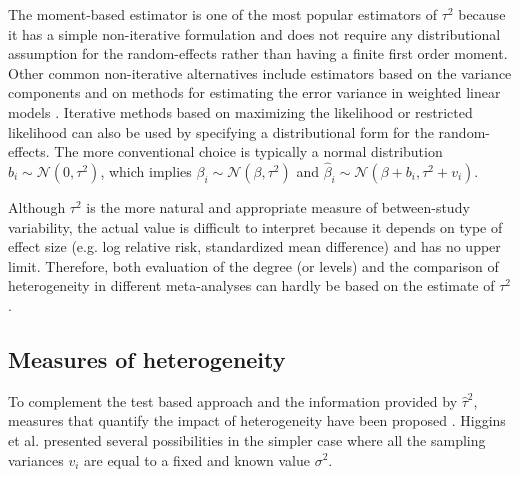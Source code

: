 \documentclass[11pt,a4paper,twoside,openany]{book}\usepackage{knitr}
\begin{document}
{\noindent The moment-based estimator is one of the most popular estimators of $\tau^2$ because it has a simple non-iterative formulation and does not require any distributional assumption for the random-effects rather than having a finite first order moment. Other common non-iterative alternatives include estimators based on the variance components \citep{hedges1983random} and on methods for estimating the error variance in weighted linear models \citep{sidik2005simple}. Iterative methods based on maximizing the likelihood or restricted likelihood can also be used by specifying a distributional form for the random-effects. The more conventional choice is typically a normal distribution $b_i \sim \mathcal{N}\left( 0, \tau^2 \right)$, which implies $\beta_i \sim \mathcal{N}\left(\beta, \tau^2 \right)$ and $\hat \beta_i \sim \mathcal{N}\left(\beta + b_i, \tau^2 + v_i \right)$.

Although $\tau^2$ is the more natural and appropriate measure of between-study variability, the actual value is difficult to interpret because it depends on type of effect size (e.g. log relative risk, standardized mean difference) and has no upper limit. Therefore, both evaluation of the degree (or levels) and the comparison of heterogeneity in different meta-analyses can hardly be based on the estimate of $\tau^2$.


\subsection{Measures of heterogeneity}\label{sec:measures_het}

To complement the test based approach and the information provided by $\hat \tau^2$, measures that quantify the impact of heterogeneity have been proposed \citep{higgins2002quantifying}. 
Higgins et al. presented several possibilities in the simpler case where all the sampling variances $v_i$ are equal to a fixed and known value $\sigma^2$. 

}
\end{document}
